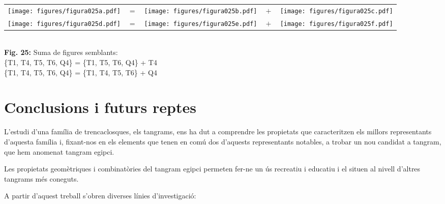 \documentclass[a4paper,11pt]{article}
\begin{document}
\begin{multicols}{2}
            \begin{center}
                \Huge
                \begin{tabular}{ccccc}
                    \texttt{[image: figures/figura025a.pdf]} & $=$ &
                    \texttt{[image: figures/figura025b.pdf]} & $\!+\!$ &
                    \texttt{[image: figures/figura025c.pdf]}\\
                    \texttt{[image: figures/figura025d.pdf]} & $=$ &
                    \texttt{[image: figures/figura025e.pdf]} & $\!+\!$ &
                    \texttt{[image: figures/figura025f.pdf]}\\
                \end{tabular}\\
                \footnotesize{\textbf{Fig. 25:} Suma de figures semblants:\\ \{T1, T4, T5, T6, Q4\} = \{T1, T5, T6, Q4\} + T4\phantom{.}\\ \{T1, T4, T5, T6, Q4\} = \{T1, T4, T5, T6\} + Q4}
            \end{center}


        \section{Conclusions i futurs reptes}

            L'estudi d'una família de trencaclosques, els tangrams, ens ha dut a comprendre les propietats que caracteritzen els millors representants d'aquesta família i, fixant-nos en els elements que tenen en comú dos d'aquests representants notables, a trobar un nou candidat a tangram, que hem anomenat tangram egipci.

            Les propietats geomètriques i combinatòries del tangram egipci permeten fer-ne un ús recreatiu i educatiu i el situen al nivell d'altres tangrams més coneguts.

            A partir d'aquest treball s'obren diverses línies d'investigació:


\end{multicols}
\end{document}
